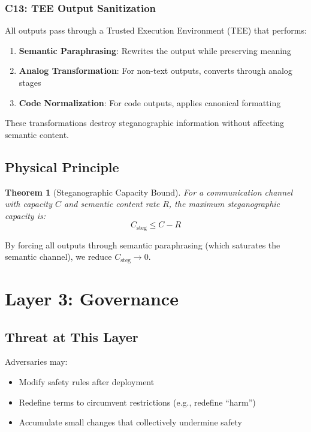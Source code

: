 \documentclass[11pt,a4paper]{article}
\newtheorem{theorem}{Theorem}
\begin{document}
\subsubsection{C13: TEE Output Sanitization}

All outputs pass through a Trusted Execution Environment (TEE) that performs:
\begin{enumerate}
    \item \textbf{Semantic Paraphrasing}: Rewrites the output while preserving meaning
    \item \textbf{Analog Transformation}: For non-text outputs, converts through analog stages
    \item \textbf{Code Normalization}: For code outputs, applies canonical formatting
\end{enumerate}

These transformations destroy steganographic information without affecting semantic content.

\subsection{Physical Principle}

\begin{theorem}[Steganographic Capacity Bound]
For a communication channel with capacity $C$ and semantic content rate $R$, the maximum steganographic capacity is:
\begin{equation}
C_{\text{steg}} \leq C - R
\end{equation}
\end{theorem}

By forcing all outputs through semantic paraphrasing (which saturates the semantic channel), we reduce $C_{\text{steg}} \to 0$.

\section{Layer 3: Governance}
\label{sec:layer3}

\subsection{Threat at This Layer}

Adversaries may:
\begin{itemize}
    \item Modify safety rules after deployment
    \item Redefine terms to circumvent restrictions (e.g., redefine ``harm'')
    \item Accumulate small changes that collectively undermine safety
\end{itemize}
\end{document}
